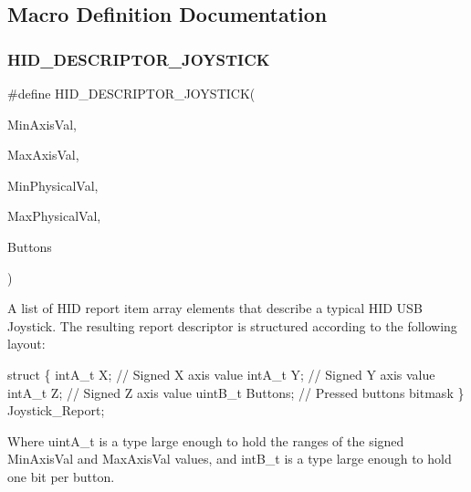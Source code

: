 \subsection{Macro Definition Documentation}
\mbox{\label{group__Group__USBClassHIDCommon_gaf7fe5010c1c53d18c53abfa5830242f3}} 
\subsubsection{\texorpdfstring{H\+I\+D\+\_\+\+D\+E\+S\+C\+R\+I\+P\+T\+O\+R\+\_\+\+J\+O\+Y\+S\+T\+I\+CK}{HID\_DESCRIPTOR\_JOYSTICK}}
{\footnotesize\ttfamily \#define H\+I\+D\+\_\+\+D\+E\+S\+C\+R\+I\+P\+T\+O\+R\+\_\+\+J\+O\+Y\+S\+T\+I\+CK(\begin{DoxyParamCaption}\item[{}]{Min\+Axis\+Val,  }\item[{}]{Max\+Axis\+Val,  }\item[{}]{Min\+Physical\+Val,  }\item[{}]{Max\+Physical\+Val,  }\item[{}]{Buttons }\end{DoxyParamCaption})}

A list of H\+ID report item array elements that describe a typical H\+ID U\+SB Joystick. The resulting report descriptor is structured according to the following layout\+:


\begin{DoxyCode}
\textcolor{keyword}{struct}
\{
    intA\_t X; \textcolor{comment}{// Signed X axis value}
    intA\_t Y; \textcolor{comment}{// Signed Y axis value}
    intA\_t Z; \textcolor{comment}{// Signed Z axis value}
    uintB\_t Buttons; \textcolor{comment}{// Pressed buttons bitmask}
\} Joystick\_Report;
\end{DoxyCode}


Where {\ttfamily uint\+A\+\_\+t} is a type large enough to hold the ranges of the signed {\ttfamily Min\+Axis\+Val} and {\ttfamily Max\+Axis\+Val} values, and {\ttfamily int\+B\+\_\+t} is a type large enough to hold one bit per button.


